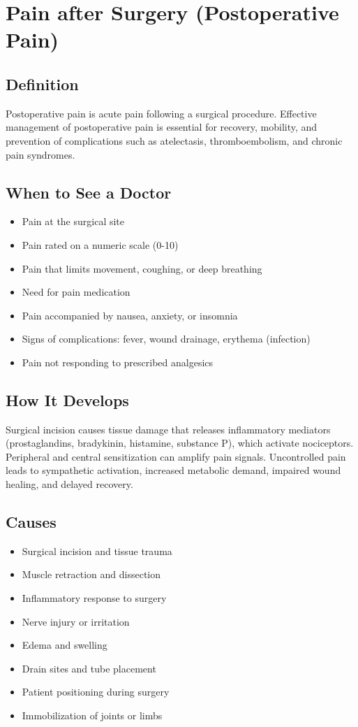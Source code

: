 \chapter{Pain after Surgery (Postoperative Pain)}

\section*{Definition}
Postoperative pain is acute pain following a surgical procedure. Effective management of postoperative pain is essential for recovery, mobility, and prevention of complications such as atelectasis, thromboembolism, and chronic pain syndromes.

\section*{When to See a Doctor}
\begin{itemize}
\item Pain at the surgical site
\item Pain rated on a numeric scale (0-10)
\item Pain that limits movement, coughing, or deep breathing
\item Need for pain medication
\item Pain accompanied by nausea, anxiety, or insomnia
\item Signs of complications: fever, wound drainage, erythema (infection)
\item Pain not responding to prescribed analgesics
\end{itemize}

\section*{How It Develops}
Surgical incision causes tissue damage that releases inflammatory mediators (prostaglandins, bradykinin, histamine, substance P), which activate nociceptors. Peripheral and central sensitization can amplify pain signals. Uncontrolled pain leads to sympathetic activation, increased metabolic demand, impaired wound healing, and delayed recovery.

\section*{Causes}
\begin{itemize}
\item Surgical incision and tissue trauma
\item Muscle retraction and dissection
\item Inflammatory response to surgery
\item Nerve injury or irritation
\item Edema and swelling
\item Drain sites and tube placement
\item Patient positioning during surgery
\item Immobilization of joints or limbs
\end{itemize}

